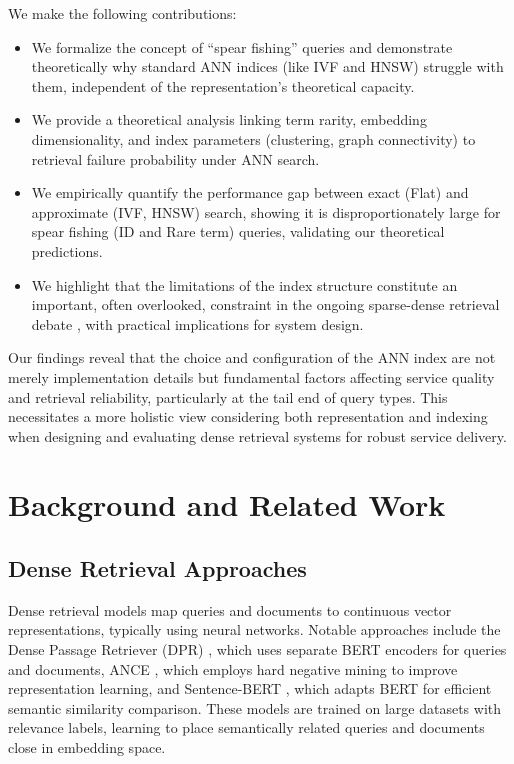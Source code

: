 \documentclass[conference,anonymous]{IEEEtran}
\begin{document}
We make the following contributions:
\begin{itemize}
    \item We formalize the concept of ``spear fishing'' queries and demonstrate theoretically why standard ANN indices (like IVF and HNSW) struggle with them, independent of the representation's theoretical capacity.
    
    \item We provide a theoretical analysis linking term rarity, embedding dimensionality, and index parameters (clustering, graph connectivity) to retrieval failure probability under ANN search.
    
    \item We empirically quantify the performance gap between exact (Flat) and approximate (IVF, HNSW) search, showing it is disproportionately large for spear fishing (ID and Rare term) queries, validating our theoretical predictions.
    
    \item We highlight that the limitations of the index structure constitute an important, often overlooked, constraint in the ongoing sparse-dense retrieval debate \cite{lin2024dense}, with practical implications for system design.
\end{itemize}

Our findings reveal that the choice and configuration of the ANN index are not merely implementation details but fundamental factors affecting service quality and retrieval reliability, particularly at the tail end of query types. This necessitates a more holistic view considering both representation and indexing when designing and evaluating dense retrieval systems for robust service delivery.

\section{Background and Related Work}

\subsection{Dense Retrieval Approaches}
Dense retrieval models map queries and documents to continuous vector representations, typically using neural networks. Notable approaches include the Dense Passage Retriever (DPR) \cite{karpukhin2020dense}, which uses separate BERT encoders for queries and documents, ANCE \cite{xiong2021approximate}, which employs hard negative mining to improve representation learning, and Sentence-BERT \cite{reimers2019sentencebert}, which adapts BERT for efficient semantic similarity comparison. These models are trained on large datasets with relevance labels, learning to place semantically related queries and documents close in embedding space.
\end{document}
